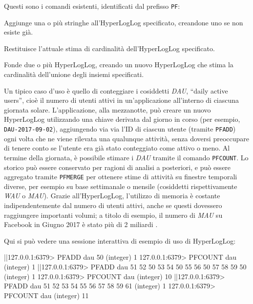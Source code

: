 Questi sono i comandi esistenti, identificati dal prefisso \verb|PF|:

\begin{description}[style=nextline,font={\bfseries\ttfamily}]
	\item[PFADD] Aggiunge una o più stringhe all'HyperLogLog spe\-ci\-fi\-ca\-to,
	creandone uno se non esiste già.
	\item[PFCOUNT] Restituisce l'attuale stima di cardinalità dell'HyperLogLog
	specificato.
	\item[PFMERGE] Fonde due o più HyperLogLog, creando un nuovo HyperLogLog che
	stima la cardinalità dell'unione degli insiemi specificati.
\end{description}

Un tipico caso d'uso è quello di conteggiare i cosiddetti \emph{DAU}, ``daily active users'', cioè
il numero di utenti attivi in un'applicazione all'interno di ciascuna giornata solare.
L'applicazione, alla mezzanotte, può creare un nuovo HyperLogLog utilizzando una chiave derivata dal
giorno in corso (per esempio, \verb|DAU-2017-09-02|), aggiungendo via via l'ID di ciascun utente
(tramite \verb|PFADD|) ogni volta che ne viene rilevata una qualunque attività, senza doversi
preoccupare di tenere conto se l'utente era già stato conteggiato come attivo o meno. Al termine
della giornata, è possibile stimare i \emph{DAU} tramite il comando \verb|PFCOUNT|. Lo storico può
essere conservato per ragioni di analisi a posteriori, e può essere aggregato tramite
\verb|PFMERGE| per ottenere stime di attività su finestre temporali diverse, per esempio su base
settimanale o mensile (cosiddetti rispettivamente \emph{WAU} o \emph{MAU}). Grazie all'HyperLogLog,
l'utilizzo di memoria è costante indipendentemente dal numero di utenti attivi, anche se questi
dovessero raggiungere importanti volumi; a titolo di esempio, il numero di \emph{MAU} su Facebook in
Giugno 2017 è stato più di 2 miliardi \cite{fb-mau}.

Qui si può vedere una sessione interattiva di esempio di uso di HyperLogLog:

\begin{commentedsource}[style=redis]
|\lnote|127.0.0.1:6379> PFADD dau 50
(integer) 1
127.0.0.1:6379> PFCOUNT dau
(integer) 1
|\lnote|127.0.0.1:6379> PFADD dau 51 52 50 53 54 50 55 56 50 57 58 59 50
(integer) 1
127.0.0.1:6379> PFCOUNT dau
(integer) 10
|\lnote|127.0.0.1:6379> PFADD dau 51 52 53 54 55 56 57 58 59 61
(integer) 1
127.0.0.1:6379> PFCOUNT dau
(integer) 11
\end{commentedsource}

